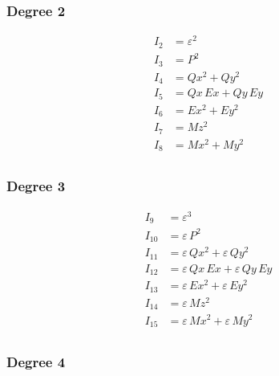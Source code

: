 \documentclass{article}
\begin{document}
\subsubsection*{Degree 2}

\begin{align*}
I_{2} &= ε^{2} \\
I_{3} &= P^{2} \\
I_{4} &= Qx^{2} + Qy^{2} \\
I_{5} &= Qx\,Ex + Qy\,Ey \\
I_{6} &= Ex^{2} + Ey^{2} \\
I_{7} &= Mz^{2} \\
I_{8} &= Mx^{2} + My^{2} \\
\end{align*}

\subsubsection*{Degree 3}

\begin{align*}
I_{9} &= ε^{3} \\
I_{10} &= ε\,P^{2} \\
I_{11} &= ε\,Qx^{2} + ε\,Qy^{2} \\
I_{12} &= ε\,Qx\,Ex + ε\,Qy\,Ey \\
I_{13} &= ε\,Ex^{2} + ε\,Ey^{2} \\
I_{14} &= ε\,Mz^{2} \\
I_{15} &= ε\,Mx^{2} + ε\,My^{2} \\
\end{align*}

\subsubsection*{Degree 4}
\end{document}
